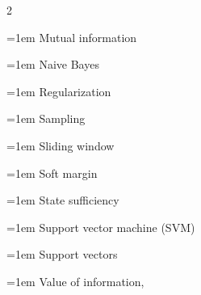 \documentclass[12pt,oneside]{article}
\newcommand{\bookindexentry}[2]{\par\noindent\hangindent=1em #1\enspace #2\par}
\begin{document}
\begin{multicols}{2}
\bookindexentry{Mutual information}{\hyperref[topic-02-2]{\pageref*{topic-02-2}}}
\bookindexentry{Naive Bayes}{\hyperref[topic-05-1]{\pageref*{topic-05-1}}}
\bookindexentry{Regularization}{\hyperref[topic-06-8]{\pageref*{topic-06-8}}}
\bookindexentry{Sampling}{\hyperref[topic-05-3]{\pageref*{topic-05-3}}}
\bookindexentry{Sliding window}{\hyperref[topic-07-4]{\pageref*{topic-07-4}}}
\bookindexentry{Soft margin}{\hyperref[topic-06-7]{\pageref*{topic-06-7}}}
\bookindexentry{State sufficiency}{\hyperref[topic-07-1]{\pageref*{topic-07-1}}}
\bookindexentry{Support vector machine (SVM)}{\hyperref[topic-06-5]{\pageref*{topic-06-5}}}
\bookindexentry{Support vectors}{\hyperref[topic-06-8]{\pageref*{topic-06-8}}}
\bookindexentry{Value of information}{\hyperref[topic-02-1]{\pageref*{topic-02-1}}, \hyperref[topic-07-3]{\pageref*{topic-07-3}}}
\end{multicols}
\end{document}
